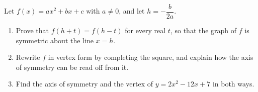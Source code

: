 Let $f(x)=ax^2+bx+c$ with $a\ne0$, and let $h=-\dfrac{b}{2a}$.
\begin{enumerate}
\item[(a)] Prove that $f(h+t)=f(h-t)$ for every real $t$, so that the graph of $f$ is symmetric about the line $x=h$.
\item[(b)] Rewrite $f$ in vertex form by completing the square, and explain how the axis of symmetry can be read off from it.
\item[(c)] Find the axis of symmetry and the vertex of $y=2x^2-12x+7$ in both ways.
\end{enumerate}
